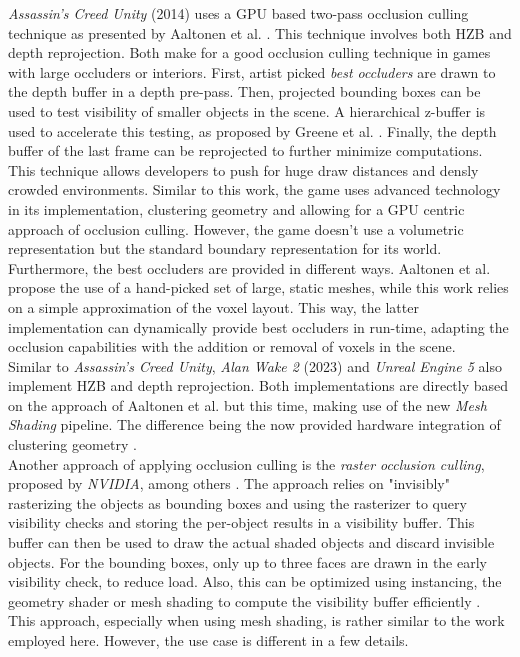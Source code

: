 \noindent
\emph{Assassin's Creed Unity} (2014) uses a \ac{GPU} based two-pass occlusion culling technique as presented by 
Aaltonen et al. \cite{Aaltonen2015}. This technique involves both \ac{HZB} and depth reprojection. Both make for 
a good occlusion culling technique in games with large occluders or interiors. First, artist picked 
\emph{best occluders} are drawn to the depth buffer in a depth pre-pass. Then, projected bounding boxes can be 
used to test visibility of smaller objects in the scene. A hierarchical z-buffer is used to accelerate this testing,
as proposed by Greene et al. \cite{Greene93,Greene95}. Finally, the depth buffer of the last frame can be 
reprojected to further minimize computations. This technique allows developers to push for huge draw distances 
and densly crowded environments. Similar to this work, the game uses advanced technology in its implementation, 
clustering geometry and allowing for a \ac{GPU} centric approach of occlusion culling. However, the game doesn't 
use a volumetric representation but the standard boundary representation for its world. Furthermore, the best 
occluders are provided in different ways. Aaltonen et al. \cite{Aaltonen2015} propose the use of a hand-picked 
set of large, static meshes, while this work relies on a simple approximation of the voxel layout. This way, 
the latter implementation can dynamically provide best occluders in run-time, adapting the occlusion capabilities 
with the addition or removal of voxels in the scene.\\

\noindent
Similar to \emph{Assassin's Creed Unity}, \emph{Alan Wake 2} (2023) and \emph{Unreal Engine 5} also implement \ac{HZB} 
and depth reprojection. Both implementations are directly based on the approach of Aaltonen et al. \cite{Aaltonen2015} 
but this time, making use of the new \emph{Mesh Shading} pipeline. The difference being the now provided hardware 
integration of clustering geometry \cite{Remedy2023,Karis2021}.  \\


Another approach of applying occlusion culling is the \emph{raster occlusion culling}, proposed by \emph{NVIDIA}, among 
others \cite{NVIDIAGLOC2016}. The approach relies on "invisibly" rasterizing the objects as bounding boxes and using the 
rasterizer to query visibility checks and storing the per-object results in a visibility buffer. This buffer can then be 
used to draw the actual shaded objects and discard invisible objects. For the bounding boxes, only up to three faces are 
drawn in the early visibility check, to reduce load. Also, this can be optimized using instancing, the geometry shader or 
mesh shading to compute the visibility buffer efficiently \cite{NVIDIAGLOC2016}. This approach, especially when using 
mesh shading, is rather similar to the work employed here. However, the use case is different in a few details.


% 